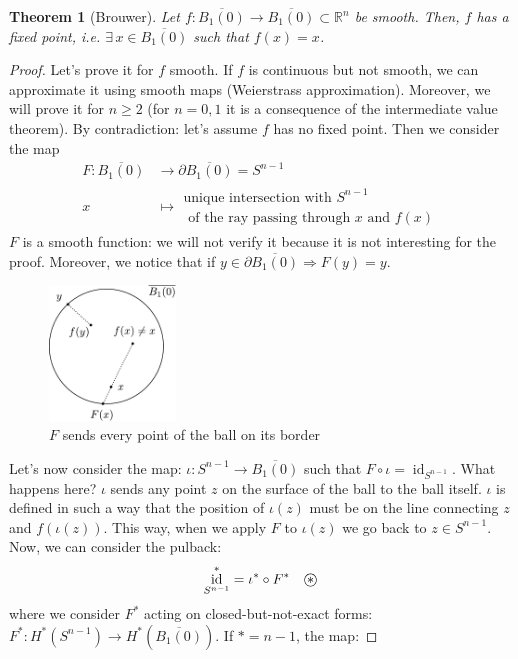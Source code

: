 \documentclass[a4paper,11pt,titlepage, article, oneside]{memoir}
\numberwithin{equation}{section}
\newtheorem{theorem}{Theorem}[section]
\theoremstyle{definition}
\theoremstyle{remark}
\DeclareMathOperator{\id}{id}
\newcommand{\rfield}{\mathbb{R}}
\newcommand\oast{\stackMath\mathbin{\stackinset{c}{0ex}{c}{0ex}{\ast}{\bigcirc}}}
\begin{document}
\begin{theorem}[Brouwer] \label{brouwerthm}
Let $f \colon \overline{B_1(0)} \rightarrow \overline{B_1(0)} \subset \rfield^n$ be smooth. Then, $f$ has a fixed point, i.e. $\exists \, x \in \overline{B_1(0)}$ such that $f(x)=x$.
\end{theorem}

\begin{proof}
Let's prove it for $f$ smooth. If $f$ is continuous but not smooth, we can approximate it using smooth maps (Weierstrass approximation). Moreover, we will prove it for $n \ge 2$ (for $n=0, 1$ it is a consequence of the intermediate value theorem).
By contradiction: let's assume $f$ has no fixed point. Then we consider the map
\begin{align*}F \colon \overline{B_1(0)} &\rightarrow \partial \overline{B_1(0)} = S^{n-1} \\
x &\mapsto \substack{\text{unique intersection with }S^{n-1} \\ \text{ of the ray passing through }x \text{ and } f(x)}
\end{align*}
$F$ is a smooth function: we will not verify it because it is not interesting for the proof. Moreover, we notice that if $y \in \partial \overline{B_1(0)} \Rightarrow F(y) = y$.
\begin{figure}[H] \label{Fig:ball10}
     \centering
     \includegraphics[width=0.3\textwidth]{Images/B_10.pdf} 
     \caption{$F$ sends every point of the ball on its border}      
\end{figure}
Let's now consider the map: $\iota \colon S^{n-1} \rightarrow \overline{B_1(0)}$ such that $F \circ \iota = \id_{S^{n-1}}$. What happens here? $\iota$ sends any point $z$ on the surface of the ball to the ball itself. $\iota$ is defined in such a way that the position of $\iota(z)$ must be on the line connecting $z$ and $f(\iota(z))$. This way, when we apply $F$ to $\iota(z)$ we go back to $z \in S^{n-1}$. Now, we can consider the pulback:
$$\id_{S^{n-1}}^* = \iota^* \circ F^* \quad \oast$$
where we consider $F^*$ acting on closed-but-not-exact forms: $F^* \colon H^*(S^{n-1}) \rightarrow H^*(\overline{B_1(0)})$. If $* = n-1$, the map:

\end{proof}
\end{document}
